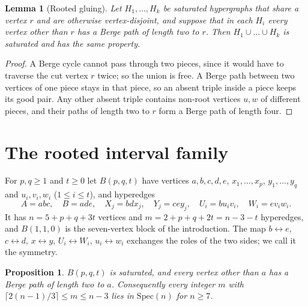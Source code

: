 \documentclass[11pt]{article}
\newtheorem{lemma}[theorem]{Lemma}
\newtheorem{proposition}[theorem]{Proposition}
\theoremstyle{remark}
\begin{document}
\begin{lemma}[Rooted gluing]\label{lem:glue}
Let $H_1,\dots,H_k$ be saturated hypergraphs that share a vertex $r$ and
are otherwise vertex-disjoint, and suppose that in each $H_i$ every vertex
other than $r$ has a Berge path of length two to $r$. Then
$H_1\cup\dots\cup H_k$ is saturated and has the same property.
\end{lemma}

\begin{proof}
A Berge cycle cannot pass through two pieces, since it would have to
traverse the cut vertex $r$ twice; so the union is free. A Berge path
between two vertices of one piece stays in that piece, so an absent
triple inside a piece keeps its good pair. Any other absent triple
contains non-root vertices $u,w$ of different pieces, and their paths of
length two to $r$ form a Berge path of length four.
\end{proof}

\section{The rooted interval family}\label{sec:interval}

For $p,q\ge1$ and $t\ge0$ let $B(p,q,t)$ have vertices
$a,b,c,d,e$, $x_1,\dots,x_p$, $y_1,\dots,y_q$ and $u_i,v_i,w_i$
($1\le i\le t$), and hyperedges
\[
A=abc,\quad B=ade,\quad X_j=bdx_j,\quad Y_j=cey_j,\quad U_i=bu_iv_i,\quad W_i=ev_iw_i .
\]
It has $n=5+p+q+3t$ vertices and $m=2+p+q+2t=n-3-t$ hyperedges, and
$B(1,1,0)$ is the seven-vertex block of the introduction. The map
$b\leftrightarrow e$, $c\leftrightarrow d$, $x\leftrightarrow y$,
$U_i\leftrightarrow W_i$, $u_i\leftrightarrow w_i$ exchanges the roles of
the two sides; we call it the symmetry.

\begin{proposition}\label{prop:interval}
$B(p,q,t)$ is saturated, and every vertex other than $a$ has a Berge path
of length two to $a$. Consequently every integer $m$ with
$\lceil2(n-1)/3\rceil\le m\le n-3$ lies in $\mathrm{Spec}(n)$ for $n\ge7$.
\end{proposition}
\end{document}
